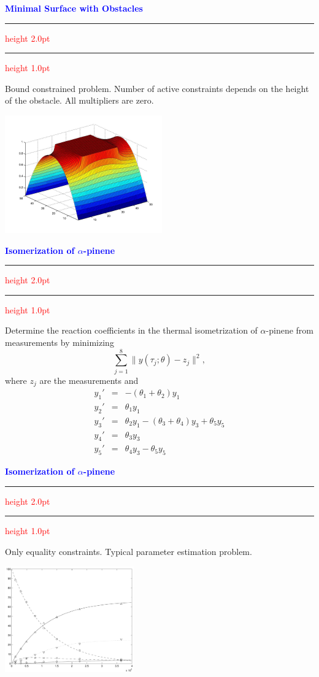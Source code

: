 \documentclass{seminar}
\newcommand{\redstripe}{\textcolor{red}{\hrule height 2.0pt\hfil}
             \vspace{-1.8pt}
             \textcolor{red}{\hrule height 1.0pt\hfil}
}
\newcommand{\heading}[1]{%
   \centerline{\textcolor{blue}{\textbf{#1}}}%
    \redstripe%
    \bigskip
}
\begin{document}
\begin{slide}

\heading{Minimal Surface with Obstacles}

Bound constrained problem. 
Number of active constraints depends on the height of the
obstacle. All multipliers are zero. 
%
\centerline {\includegraphics[height=2.0in]{../images/mso}}

\end{slide}

\begin{slide}

\heading{Isomerization of $ \alpha $-pinene}

Determine the reaction coefficients
in the thermal isometrization of $\alpha$-pinene from measurements by minimizing
\[
\sum _ {j=1}^8 \| y ( \tau_j ; \theta ) - z_j \| ^ 2 ,
\]
where $z_j$ are the measurements and
\begin{eqnarray*}
y_1'  & = & -(\theta_1 + \theta_2) y_1 \\
y_2'  & = & \theta_1 y_1 \\
y_3'  & = & \theta_2 y_1 - (\theta_3 + \theta_4 )y_3 + \theta_5 y_5 \\
y_4'  & = & \theta_3 y_3 \\
y_5'  & = & \theta_4 y_3 - \theta_5 y_5 \nonumber
\end{eqnarray*}

\vfill

\end{slide}

\begin{slide}

\heading{Isomerization of $\alpha$-pinene}

Only equality constraints. Typical parameter estimation problem. 

\bigskip

\centerline {\includegraphics[height=1.8in]{../images/pinene}}

\vfill

\end{slide}
\end{document}

